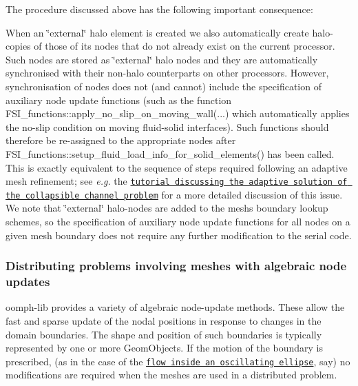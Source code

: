 The procedure discussed above has the following important consequence\+: ~\newline

\begin{DoxyItemize}
\item When an \char`\"{}external\char`\"{} halo element is created we also automatically create halo-\/copies of those of its nodes that do not already exist on the current processor. Such nodes are stored as \char`\"{}external\char`\"{} halo nodes and they are automatically synchronised with their non-\/halo counterparts on other processors. However, synchronisation of nodes does not (and cannot) include the specification of auxiliary node update functions (such as the function {\ttfamily F\+S\+I\+\_\+functions\+::apply\+\_\+no\+\_\+slip\+\_\+on\+\_\+moving\+\_\+wall}(...) which automatically applies the no-\/slip condition on moving fluid-\/solid interfaces). Such functions should therefore be re-\/assigned to the appropriate nodes after {\ttfamily F\+S\+I\+\_\+functions\+::setup\+\_\+fluid\+\_\+load\+\_\+info\+\_\+for\+\_\+solid\+\_\+elements()} has been called. This is exactly equivalent to the sequence of steps required following an adaptive mesh refinement; see {\itshape  e.\+g.} the \href{../../../interaction/fsi_collapsible_channel_adapt/html/index.html#before_and_after}{\tt tutorial discussing the adaptive solution of the collapsible channel problem} for a more detailed discussion of this issue. We note that \char`\"{}external\char`\"{} halo-\/nodes are added to the mesh\textquotesingle{}s boundary lookup schemes, so the specification of auxiliary node update functions for all nodes on a given mesh boundary does not require any further modification to the serial code.
\end{DoxyItemize}



\hypertarget{index_alg_node_update}{}\subsubsection{Distributing problems involving meshes with algebraic node updates}\label{index_alg_node_update}
{\ttfamily oomph-\/lib} provides a variety of algebraic node-\/update methods. These allow the fast and sparse update of the nodal positions in response to changes in the domain boundaries. The shape and position of such boundaries is typically represented by one or more {\ttfamily Geom\+Objects}. If the motion of the boundary is prescribed, (as in the case of the \href{../../../navier_stokes/osc_ellipse/html/index.html}{\tt flow inside an oscillating ellipse}, say) no modifications are required when the meshes are used in a distributed problem.

